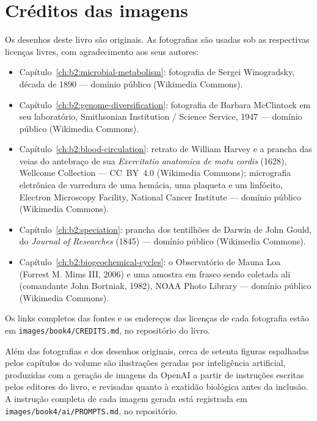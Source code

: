 \chapter*{Créditos das imagens}

\begingroup\sloppy

Os desenhos deste livro são originais. As fotografias são usadas sob
as respectivas licenças livres, com agradecimento aos seus autores:

\begin{itemize}
  \item Capítulo~\ref{ch:b2:microbial-metabolism}: fotografia de Sergei
        Winogradsky, década de 1890 --- domínio público (Wikimedia Commons).
  \item Capítulo~\ref{ch:b2:genome-diversification}: fotografia de
        Barbara McClintock em seu laboratório, Smithsonian Institution /
        Science Service, 1947 --- domínio público (Wikimedia Commons).
  \item Capítulo~\ref{ch:b2:blood-circulation}: retrato de William
        Harvey e a prancha das veias do antebraço de sua
        \emph{Exercitatio anatomica de motu cordis} (1628), Wellcome
        Collection --- CC~BY~4.0 (Wikimedia Commons); micrografia
        eletrônica de varredura de uma hemácia, uma plaqueta e um
        linfócito, Electron Microscopy Facility, National Cancer
        Institute --- domínio público (Wikimedia Commons).
  \item Capítulo~\ref{ch:b2:speciation}: prancha dos tentilhões de Darwin
        de John Gould, do \emph{Journal of Researches} (1845) --- domínio
        público (Wikimedia Commons).
  \item Capítulo~\ref{ch:b2:biogeochemical-cycles}: o Observatório de
        Mauna Loa (Forrest M. Mims III, 2006) e uma amostra em frasco
        sendo coletada ali (comandante John Bortniak, 1982), NOAA Photo
        Library --- domínio público (Wikimedia Commons).
\end{itemize}

Os links completos das fontes e os endereços das licenças de cada
fotografia estão em \texttt{images/\allowbreak book4/\allowbreak CREDITS.md},
no repositório do livro.

\bigskip
Além das fotografias e dos desenhos originais, cerca de setenta
figuras espalhadas pelos capítulos do volume são ilustrações geradas
por inteligência artificial, produzidas com a geração de imagens da
OpenAI a partir de instruções escritas pelos editores do livro, e
revisadas quanto à exatidão biológica antes da inclusão. A instrução
completa de cada imagem gerada está registrada em
\texttt{images/\allowbreak book4/\allowbreak ai/\allowbreak PROMPTS.md}, no repositório.
\par\endgroup
\clearpage
